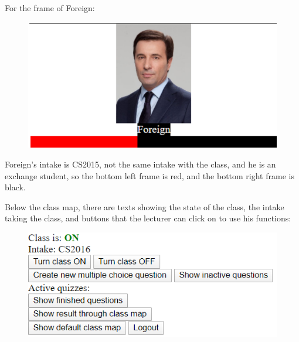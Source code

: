 \documentclass[a4paper, 11pt,openany]{book} %
\begin{document}
For the frame of Foreign:
\begin{figure}[H]
    \centering
    \includegraphics[width=\textwidth,height=\textheight,keepaspectratio]{images/12.png}
\end{figure}
Foreign’s intake is CS2015, not the same intake with the class, and he is an exchange student, so the bottom left frame is red, and the bottom right frame is black.\par 
Below the class map, there are texts showing the state of the class, the intake taking the class, and buttons that the lecturer can click on to use his functions:
\begin{figure}[H]
    \centering
    \includegraphics[width=\textwidth,height=\textheight,keepaspectratio]{images/13.png}
\end{figure}
\end{document}
